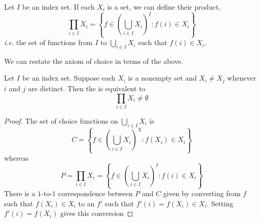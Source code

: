 \documentclass{scrbook}
\newcommand{\ie}{\emph{i.e.}\xspace}
\begin{document}
\begin{defn}
  Let $I$ be an index set. If each $X_i$ is a set, we can define their product,
  \[
  \prod_{i\in I} X_i=\left\{f\in\left(\bigcup_{i\in I} X_i\right)^I: f(i)\in X_i\right\}
  \]
  \ie the set of functions from $I$ to $\bigcup_{i\in I} X_i$ such that $f(i)\in X_i$. 
\end{defn}
We can restate the axiom of choice in terms of the above.
\begin{theorem}
  Let $I$ be an index set. Suppose each $X_i$ is a nonempty set and $X_i\neq X_j$ whenever $i$ and $j$ are distinct. Then the  is equivalent to
  \begin{equation}
    \prod_{i\in I} X_i\neq \emptyset
    \label{eq:nonempty-prod}
  \end{equation}
\end{theorem}
\begin{proof}
The set of choice functions on $\bigcup_{i\in I} X_i$ is 
  \[
  C=\left\{f\in \left(\bigcup_{i\in I} X_i\right)^X: f(X_i)\in X_i\right\}
  \]
  whereas
  \[
  P=\prod_{i\in I} X_i = \left\{f\in\left(\bigcup_{i\in I} X_i\right)^I: f(i) \in X_i\right\}
  \]
  There is a $1$-to-$1$ correspondence between $P$ and $C$ given by converting from $f$ such that $f(X_i)\in X_i$ to an $f'$ such that $f'(i)=f(X_i)\in X_i$. Setting $f'(i)=f(X_i)$ gives this conversion
\end{proof}
\end{document}

